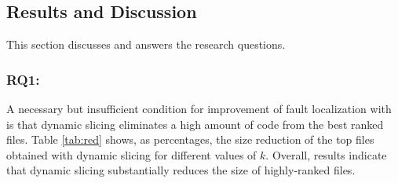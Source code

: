 \documentclass{article}
\begin{document}

\subsection{Results and Discussion}

This section discusses and answers the research questions.







\subsubsection{\label{rq:1}RQ1: \rqone}

A necessary but insufficient condition for improvement of fault
localization with \comb{} is that dynamic slicing eliminates a high
amount of code from the best ranked files. Table \ref{tab:red} shows,
as percentages, the size reduction of the top files obtained with
dynamic slicing for different values of $k$. Overall, results indicate
that dynamic slicing substantially reduces the size of highly-ranked
files.



\end{document}
